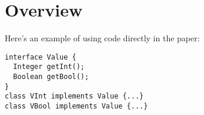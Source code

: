 \section{Overview}\label{subsec:backgound}

Here's an example of using code directly in the paper: 

\begin{lstlisting}[numbers=none]
interface Value {
  Integer getInt();
  Boolean getBool();
}
class VInt implements Value {...}
class VBool implements Value {...}
\end{lstlisting}